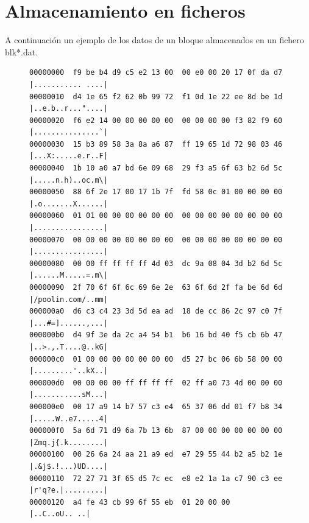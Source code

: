 \documentclass{article}
\begin{document}
\section{Almacenamiento en ficheros}
    A continuación un ejemplo de los datos de un bloque almacenados en un fichero blk*.dat.
    \begin{figure}[H]
        \centering
            \begin{verbatim}
00000000  f9 be b4 d9 c5 e2 13 00  00 e0 00 20 17 0f da d7  |........... ....|
00000010  d4 1e 65 f2 62 0b 99 72  f1 0d 1e 22 ee 8d be 1d  |..e.b..r..."....|
00000020  f6 e2 14 00 00 00 00 00  00 00 00 00 f3 82 f9 60  |...............`|
00000030  15 b3 89 58 3a 8a a6 87  ff 19 65 1d 72 98 03 46  |...X:.....e.r..F|
00000040  1b 10 a0 a7 bd 6e 09 68  29 f3 a5 6f 63 b2 6d 5c  |.....n.h)..oc.m\|
00000050  88 6f 2e 17 00 17 1b 7f  fd 58 0c 01 00 00 00 00  |.o.......X......|
00000060  01 01 00 00 00 00 00 00  00 00 00 00 00 00 00 00  |................|
00000070  00 00 00 00 00 00 00 00  00 00 00 00 00 00 00 00  |................|
00000080  00 00 ff ff ff ff 4d 03  dc 9a 08 04 3d b2 6d 5c  |......M.....=.m\|
00000090  2f 70 6f 6f 6c 69 6e 2e  63 6f 6d 2f fa be 6d 6d  |/poolin.com/..mm|
000000a0  d6 c3 c4 23 3d 5d ea ad  18 de cc 86 2c 97 c0 7f  |...#=]......,...|
000000b0  d4 9f 3e da 2c a4 54 b1  b6 16 bd 40 f5 cb 6b 47  |..>.,.T....@..kG|
000000c0  01 00 00 00 00 00 00 00  d5 27 bc 06 6b 58 00 00  |.........'..kX..|
000000d0  00 00 00 00 ff ff ff ff  02 ff a0 73 4d 00 00 00  |...........sM...|
000000e0  00 17 a9 14 b7 57 c3 e4  65 37 06 dd 01 f7 b8 34  |.....W..e7.....4|
000000f0  5a 6d 71 d9 6a 7b 13 6b  87 00 00 00 00 00 00 00  |Zmq.j{.k........|
00000100  00 26 6a 24 aa 21 a9 ed  e7 29 55 44 b2 a5 b2 1e  |.&j$.!...)UD....|
00000110  72 27 71 3f 65 d5 7c ec  e8 e2 1a 1a c7 90 c3 ee  |r'q?e.|.........|
00000120  a4 fe 43 cb 99 6f 55 eb  01 20 00 00              |..C..oU.. ..|
            \end{verbatim}
        \end{figure}
\end{document}
